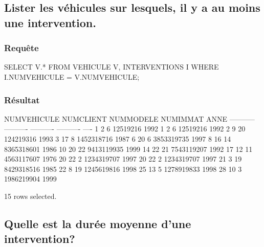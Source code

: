 \documentclass[•]{article}
\begin{document}
\subsection{Lister les véhicules sur lesquels, il y a au moins une intervention.}
\subsubsection{Requête}
\begin{sql}
SELECT V.* FROM VEHICULE V, INTERVENTIONS I WHERE I.NUMVEHICULE = V.NUMVEHICULE;
\end{sql}
\subsubsection{Résultat}
\begin{sql}
    NUMVEHICULE  NUMCLIENT  NUMMODELE   NUMIMMAT ANNE                               
    ----------- ---------- ---------- ---------- ----                               
              1          2          6   12519216 1992                               
              1          2          6   12519216 1992                               
              2          9         20  124219316 1993                               
              3         17          8 1452318716 1987                               
              6         20          6 3853319735 1997                               
              8         16         14 8365318601 1986                               
             10         20         22 9413119935 1999                               
             14         22         21 7543119207 1992                               
             17         12         11 4563117607 1976                               
             20         22          2 1234319707 1997                               
             20         22          2 1234319707 1997                               
             21          3         19 8429318516 1985                               
             22          8         19 1245619816 1998                               
             25         13          5 1278919833 1998                               
             28         10          3 1986219904 1999                               
    
    15 rows selected.
\end{sql}
\subsection{Quelle est la durée moyenne d’une intervention?}
\end{document}
